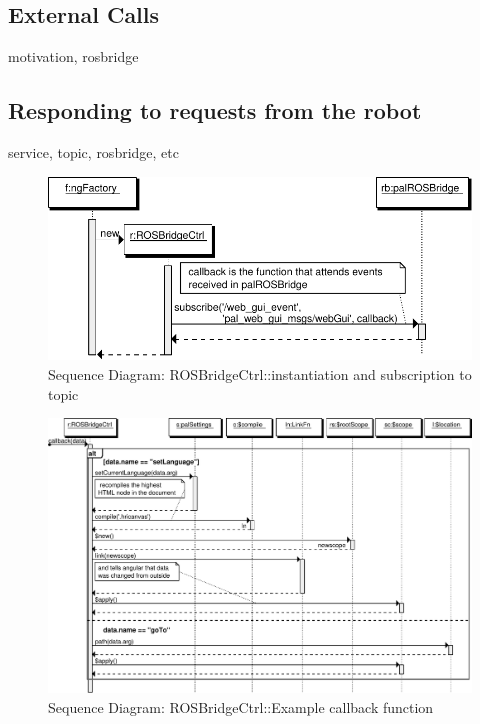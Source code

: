 \FloatBarrier

\subsection{External Calls}
motivation, rosbridge

\subsection{Responding to requests from the robot}
service, topic, rosbridge, etc

\begin{figure}[htb]
    \centering
    \includegraphics{figures/design/seqdia/ROSBridgeCtrl-creation.pdf}
    \caption{Sequence Diagram: ROSBridgeCtrl::instantiation and subscription to topic}
    \label{fig:design-seqdia-ROSBridgeCtrl-creation}
\end{figure}

\begin{figure}
    \centering
    \includegraphics{figures/design/seqdia/ROSBridgeCtrl-callback.pdf}
    \caption{Sequence Diagram: ROSBridgeCtrl::Example callback function}
    \label{fig:design-seqdia-ROSBridgeCtrl-callback}
\end{figure}

